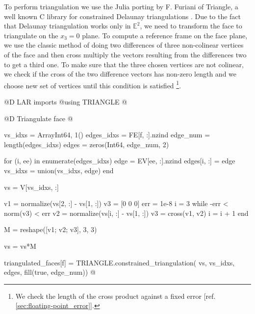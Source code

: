 To perform triangulation we use the
Julia porting by F. Furiani of Triangle, 
a well known C library for constrained 
Delaunay triangulations \cite{Triangle.jl}\cite{Triangle}.
Due to the fact that Delaunay triangulation works only
in $\mathbb{E}^2$, we need to transform the face to triangulate
on the $x_3=0$ plane. To compute a reference frame on the
face plane, we use the classic method of doing two differences 
of three non-colinear vertices of the face
and then cross multiply the vectors resulting from the differences
two to get a third one.
To make sure that the three chosen vertices are not colinear, we
check if the cross of the two difference vectors has non-zero length
and we choose new set of vertices until this condition is satisfied%
\footnote{We check the length of the cross product against a fixed
error [ref. \ref{sec:floating-point_error}].}.

@D LAR imports
@{using TRIANGLE
@}

@D Triangulate face
@{vs_idxs = Array{Int64, 1}()
edges_idxs = FE[f, :].nzind
edge_num = length(edges_idxs)
edges = zeros(Int64, edge_num, 2)

for (i, ee) in enumerate(edges_idxs)
    edge = EV[ee, :].nzind
    edges[i, :] = edge
    vs_idxs = union(vs_idxs, edge)
end

vs = V[vs_idxs, :]

v1 = normalize(vs[2, :] - vs[1, :])
v3 = [0 0 0]
err = 1e-8
i = 3
while -err < norm(v3) < err
    v2 = normalize(vs[i, :] - vs[1, :])
    v3 = cross(v1, v2)
    i = i + 1
end

M = reshape([v1; v2; v3], 3, 3)

vs = vs*M

triangulated_faces[f] = TRIANGLE.constrained_triangulation(
    vs, vs_idxs, edges, fill(true, edge_num))
@}